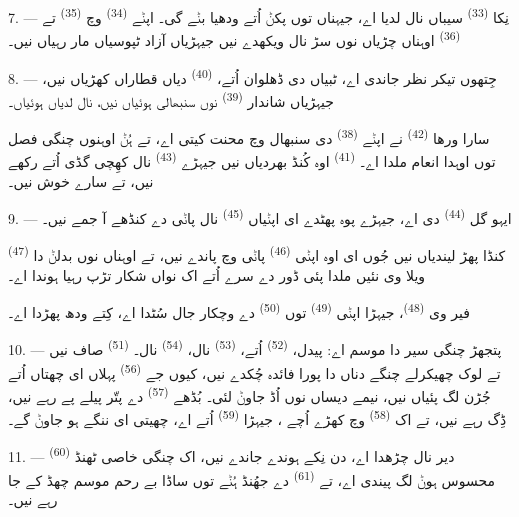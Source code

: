 7. --- نِکا  \textsuperscript{(33)} سیباں نال لدیا اے، جیہناں
توں پکݨ اُتے ودھیا  بݨے گی۔ اپݨے 
\textsuperscript{(34)} وچ  \textsuperscript{(35)} تے
 \textsuperscript{(36)} اوہناں چڑیاں نوں سڑ نال ویکھدے نیں جیہڑیاں
آزاد ٹپوسیاں مار رہیاں نیں۔

8. --- جِتھوں تیکر نظر جاندی اے، ٹبیاں دی ڈھلوان اُتے، 
\textsuperscript{(40)} دیاں قطاراں کھڑیاں نیں، جیہڑیاں شاندار 
\textsuperscript{(39)} نوں سنبھالی ہوئیاں نیں،  نال لدیاں ہوئیاں۔

سارا ورھا  \textsuperscript{(42)} نے اپݨے
 \textsuperscript{(38)} دی سنبھال وچ محنت کیتی اے، تے ہُݨ
اوہنوں چنگی فصل توں اوہدا انعام ملدا اے۔ 
\textsuperscript{(41)} اوہ کُنڈ بھردیاں نیں جیہڑے 
\textsuperscript{(43)} نال کھِچی گڈی اُتے رکھے نیں، تے سارے خوش نیں۔

\VUsaut{5.0mm}
\VUsaut{3.4mm}

9. --- ایہو گل  \textsuperscript{(44)} دی اے، جیہڑے پوہ پھٹدے
ای اپݨیاں  \textsuperscript{(45)} نال پاݨی دے کنڈھے آ جمے نیں۔

 \textsuperscript{(47)} کنڈا پھڑ لیندیاں نیں جُوں ای اوہ اپݨی
 \textsuperscript{(46)} پاݨی وچ پاندے نیں، تے اوہناں نوں 
بدلݨ دا ویلا وی نئیں ملدا پئی ڈور دے سرے اُتے اک نواں شکار تڑپ رہیا ہوندا اے۔

فیر وی  \textsuperscript{(48)}، جیہڑا اپݨی 
\textsuperscript{(49)} توں  \textsuperscript{(50)} دے وچکار جال سُٹدا اے،
کِتے ودھ پھڑدا اے۔

10. --- پتجھڑ چنگی سیر دا موسم اے: پیدل،  \textsuperscript{(52)}
اُتے،  \textsuperscript{(53)} نال،  \textsuperscript{(54)}
نال۔  \textsuperscript{(51)} صاف نیں تے لوک چھیکرلے چنگے دناں دا پورا
فائدہ چُکدے نیں، کیوں جے  \textsuperscript{(56)} پہلاں ای چھتاں اُتے
جُڑن لگ پئیاں نیں، نیمے دیساں نوں اُڈ جاوݨ لئی۔ بُڈھے 
\textsuperscript{(57)} دے پتّر پیلے پے رہے نیں،  ڈِگ رہے نیں، تے اک
 \textsuperscript{(58)} وچ کھڑے اُچے ، جیہڑا
 \textsuperscript{(59)} اُتے اے، چھیتی ای ننگے ہو جاوݨ گے۔

11. ---  \textsuperscript{(60)} دیر نال چڑھدا اے، دن نِکے ہوندے جاندے
نیں،  اک چنگی خاصی ٹھنڈ محسوس ہوݨ لگ پیندی اے، تے 
\textsuperscript{(61)} دے جھُنڈ ہُݨے توں ساڈا بے رحم موسم چھڈ کے جا رہے نیں۔
\VUsaut{6.0mm}
\VUfilet{22mm}
